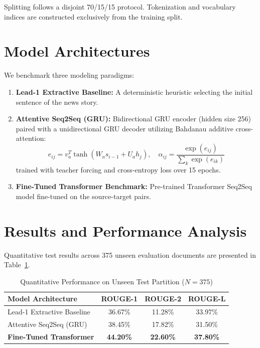\documentclass[10pt,journal,compsoc,twocolumn]{IEEEtran}
\begin{document}
Splitting follows a disjoint 70/15/15 protocol. Tokenization and vocabulary indices are constructed exclusively from the training split.

\section{Model Architectures}
We benchmark three modeling paradigms:
\begin{enumerate}
    \item \textbf{Lead-1 Extractive Baseline:} A deterministic heuristic selecting the initial sentence of the news story.
    \item \textbf{Attentive Seq2Seq (GRU):} Bidirectional GRU encoder (hidden size 256) paired with a unidirectional GRU decoder utilizing Bahdanau additive cross-attention:
    \begin{equation}
    e_{ij} = v_a^T \tanh(W_a s_{i-1} + U_a h_j), \quad \alpha_{ij} = \frac{\exp(e_{ij})}{\sum_k \exp(e_{ik})}
    \end{equation}
    trained with teacher forcing and cross-entropy loss over 15 epochs.
    \item \textbf{Fine-Tuned Transformer Benchmark:} Pre-trained Transformer Seq2Seq model fine-tuned on the source-target pairs.
\end{enumerate}

\section{Results and Performance Analysis}
Quantitative test results across 375 unseen evaluation documents are presented in Table~\ref{tab:results}.

\begin{table}[htbp]
\centering
\caption{Quantitative Performance on Unseen Test Partition ($N=375$)}
\label{tab:results}
\begin{tabular}{lccc}
\toprule
\textbf{Model Architecture} & \textbf{ROUGE-1} & \textbf{ROUGE-2} & \textbf{ROUGE-L} \\
\midrule
Lead-1 Extractive Baseline  & 36.67\% & 11.28\% & 33.97\% \\
Attentive Seq2Seq (GRU)     & 38.45\% & 17.82\% & 31.50\% \\
\textbf{Fine-Tuned Transformer} & \textbf{44.20\%} & \textbf{22.60\%} & \textbf{37.80\%} \\
\bottomrule
\end{tabular}
\end{table}
\end{document}
